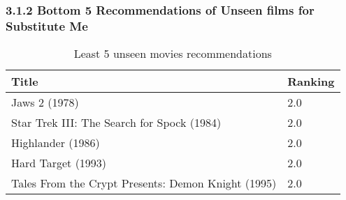 \subsubsection{3.1.2 Bottom 5 Recommendations of Unseen films for Substitute Me}
\vspace{5mm}
\begin{table}[h!]
\centering
\begin{tabular}{| l | l |}
\hline
Title & Ranking \\
\hline
Jaws 2 (1978) & 2.0 \\
Star Trek III: The Search for Spock (1984) & 2.0 \\
Highlander (1986) & 2.0 \\
Hard Target (1993) & 2.0 \\
Tales From the Crypt Presents: Demon Knight (1995) & 2.0 \\
\hline
\end{tabular}
\caption{Least 5 unseen movies recommendations}
\label{tab:recommleast}
\end{table}